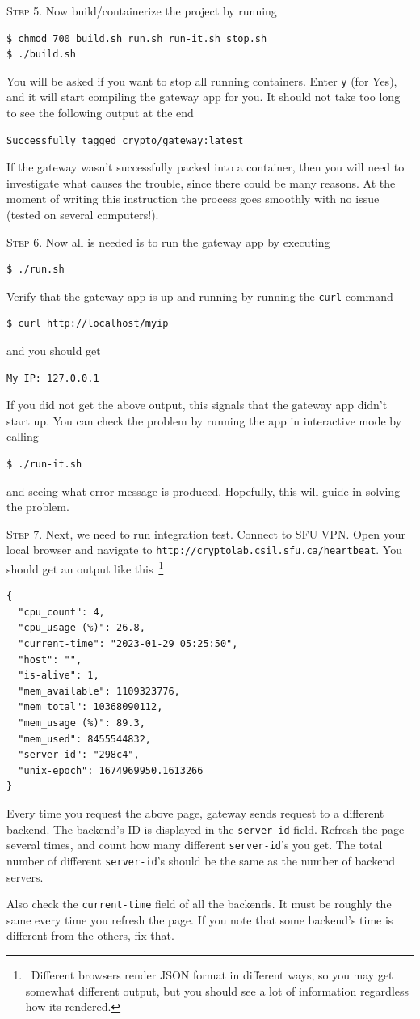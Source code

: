\documentclass{article}
\begin{document}
\vspace{0.5cm}

\textsc{Step 5}. Now build/containerize the project by running
\begin{lstlisting}
$ chmod 700 build.sh run.sh run-it.sh stop.sh
$ ./build.sh
\end{lstlisting}
You will be asked if you want to stop all running containers. Enter \texttt{y} (for Yes), and it will start compiling the gateway app for you. It should not take too long to see the following output at the end
\begin{lstlisting}
Successfully tagged crypto/gateway:latest
\end{lstlisting}
If the gateway wasn't successfully packed into a container, then you will need to investigate what causes the trouble, since there could be many reasons. At the moment of writing this instruction the process goes smoothly with no issue (tested on several computers!).

\vspace{0.5cm}

\textsc{Step 6}. Now all is needed is to run the gateway app by executing
\begin{lstlisting}
$ ./run.sh
\end{lstlisting}
Verify that the gateway app is up and running by running the \texttt{curl} command
\begin{lstlisting}
$ curl http://localhost/myip
\end{lstlisting}
and you should get
\begin{lstlisting}
My IP: 127.0.0.1
\end{lstlisting}
If you did not get the above output, this signals that the gateway app didn't start up. You can check the problem by running the app in interactive mode by calling
\begin{lstlisting}
$ ./run-it.sh
\end{lstlisting}
and seeing what error message is produced. Hopefully, this will guide in solving the problem.

\vspace{0.5cm}

\textsc{Step 7}. Next, we need to run integration test. Connect to SFU VPN. Open your local browser and navigate to \texttt{http://cryptolab.csil.sfu.ca/heartbeat}. You should get an output like this~\footnote{\ Different browsers render JSON format in different ways, so you may get somewhat different output, but you should see a lot of information regardless how its rendered.}
\begin{lstlisting}
{
  "cpu_count": 4,
  "cpu_usage (%)": 26.8,
  "current-time": "2023-01-29 05:25:50",
  "host": "",
  "is-alive": 1,
  "mem_available": 1109323776,
  "mem_total": 10368090112,
  "mem_usage (%)": 89.3,
  "mem_used": 8455544832,
  "server-id": "298c4",
  "unix-epoch": 1674969950.1613266
}
\end{lstlisting}
Every time you request the above page, gateway sends request to a different backend. The backend's ID is displayed in the \texttt{server-id} field. Refresh the page several times, and count how many different \texttt{server-id}'s you get. The total number of different \texttt{server-id}'s should be the same as the number of backend servers.

Also check the \texttt{current-time} field of all the backends. It must be roughly the same every time you refresh the page. If you note that some backend's time is different from the others, fix that.
\end{document}

